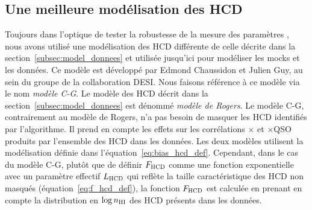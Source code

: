 \subsection{Une meilleure modélisation des HCD}
\label{subsec:model_alter_hcd}
Toujours dans l'optique de tester la robustesse de la mesure des paramètres \lya{}, nous avons utilisé une modélisation des HCD différente de celle décrite dans la section~\ref{subsec:model_donnees} et utilisée jusqu'ici pour modéliser les mocks et les données.
Ce modèle est développé par Edmond Chaussidon et Julien Guy, au sein du groupe \lya{} de la collaboration DESI.
Nous faisons référence à ce modèle via le nom \emph{modèle C-G}. Le modèle des HCD décrit dans la section~\ref{subsec:model_donnees} est dénommé \emph{modèle de Rogers}.
Le modèle C-G, contrairement au modèle de Rogers, n'a pas besoin de masquer les HCD identifiés par l'algorithme. Il prend en compte les effets sur les corrélations \lya{}$\times$\lya{} et \lya{}$\times$QSO produits par l'ensemble des HCD dans les données.
Les deux modèles utilisent la modélisation définie dans l'équation~\ref{eq:bias_hcd_def}.
Cependant, dans le cas du modèle C-G, plutôt que de définir $F_{\textsc{HCD}}$ comme une fonction exponentielle avec un paramètre effectif $L_{\textsc{HCD}}$ qui reflète la taille caractéristique des HCD non masqués (équation~\ref{eq:f_hcd_def}),
la fonction $F_{\textsc{HCD}}$ est calculée en prenant en compte la distribution en $\log n_{\textsc{HI}}$ des HCD présents dans les données.
